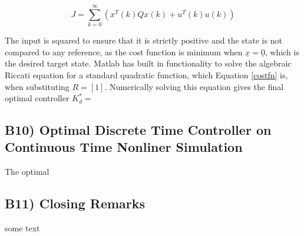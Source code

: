 \documentclass{article}
\begin{document}
\begin{equation}\label{costfn}
    J = \sum_{k=0}^{\infty} \left( x^T(k) Q x(k) + u^T(k) u(k) \right)
\end{equation}

The input is squared to ensure that it is strictly positive and the state is not compared to any reference, as the cost function is minimum when $\underline{x}=\underline{0}$, which is the desired target state. Matlab has built in functionality to solve the algebraic Riccati equation for a standard quadratic function, which Equation \ref{costfn} is, when substituting $R=[1]$. Numerically solving this equation gives the final optimal controller $K^*_d=$


\subsection*{B10) Optimal Discrete Time Controller on Continuous Time Nonliner Simulation}
The optimal 


\subsection*{B11) Closing Remarks}
some text
\end{document}
